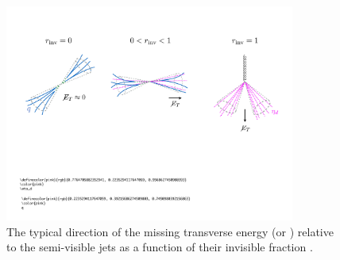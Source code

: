 \begin{figure}[htbp]
\centering
\includegraphics[width=0.85\textwidth]{figures/svj/metfigure.pdf}
\caption[The typical direction of the missing transverse energy relative to the semi-visible jets as a function of the invisible fraction \rinv]{The typical direction of the missing transverse energy \ETslash\xspace (or \ptmiss) relative to the semi-visible jets as a function of their invisible fraction \rinv \cite{Cohen:2017pzm}.}
\label{fig:theory_svj_met_dir}
\end{figure}

